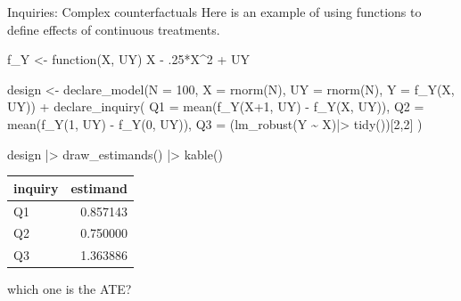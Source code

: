 \documentclass[
  11pt,
  ignorenonframetext,
]{beamer}
\newenvironment{Shaded}{\begin{snugshade}}{\end{snugshade}}
\newcommand{\AttributeTok}[1]{\textcolor[rgb]{0.40,0.45,0.13}{#1}}
\newcommand{\ControlFlowTok}[1]{\textcolor[rgb]{0.00,0.23,0.31}{#1}}
\newcommand{\DecValTok}[1]{\textcolor[rgb]{0.68,0.00,0.00}{#1}}
\newcommand{\FunctionTok}[1]{\textcolor[rgb]{0.28,0.35,0.67}{#1}}
\newcommand{\NormalTok}[1]{\textcolor[rgb]{0.00,0.23,0.31}{#1}}
\newcommand{\OtherTok}[1]{\textcolor[rgb]{0.00,0.23,0.31}{#1}}
\newcommand{\SpecialCharTok}[1]{\textcolor[rgb]{0.37,0.37,0.37}{#1}}
\begin{document}
\begin{frame}[fragile]{Inquiries: Complex counterfactuals}
\protect\hypertarget{inquiries-complex-counterfactuals-1}{}
Here is an example of using functions to define effects of continuous
treatments.

\begin{Shaded}
\begin{Highlighting}[]
\NormalTok{f\_Y }\OtherTok{\textless{}{-}} \ControlFlowTok{function}\NormalTok{(X, UY) X }\SpecialCharTok{{-}}\NormalTok{ .}\DecValTok{25}\SpecialCharTok{*}\NormalTok{X}\SpecialCharTok{\^{}}\DecValTok{2} \SpecialCharTok{+}\NormalTok{ UY}

\NormalTok{design }\OtherTok{\textless{}{-}} 
  \FunctionTok{declare\_model}\NormalTok{(}\AttributeTok{N =} \DecValTok{100}\NormalTok{,}
                \AttributeTok{X  =} \FunctionTok{rnorm}\NormalTok{(N),}
                \AttributeTok{UY =} \FunctionTok{rnorm}\NormalTok{(N),}
                \AttributeTok{Y =} \FunctionTok{f\_Y}\NormalTok{(X, UY)) }\SpecialCharTok{+}
  \FunctionTok{declare\_inquiry}\NormalTok{(}
    \AttributeTok{Q1 =} \FunctionTok{mean}\NormalTok{(}\FunctionTok{f\_Y}\NormalTok{(X}\SpecialCharTok{+}\DecValTok{1}\NormalTok{, UY) }\SpecialCharTok{{-}} \FunctionTok{f\_Y}\NormalTok{(X, UY)),}
    \AttributeTok{Q2 =} \FunctionTok{mean}\NormalTok{(}\FunctionTok{f\_Y}\NormalTok{(}\DecValTok{1}\NormalTok{, UY) }\SpecialCharTok{{-}} \FunctionTok{f\_Y}\NormalTok{(}\DecValTok{0}\NormalTok{, UY)),}
    \AttributeTok{Q3 =}\NormalTok{ (}\FunctionTok{lm\_robust}\NormalTok{(Y }\SpecialCharTok{\textasciitilde{}}\NormalTok{ X)}\SpecialCharTok{|\textgreater{}} \FunctionTok{tidy}\NormalTok{())[}\DecValTok{2}\NormalTok{,}\DecValTok{2}\NormalTok{]}
\NormalTok{    )}

\NormalTok{design }\SpecialCharTok{|\textgreater{}} \FunctionTok{draw\_estimands}\NormalTok{() }\SpecialCharTok{|\textgreater{}} \FunctionTok{kable}\NormalTok{()}
\end{Highlighting}
\end{Shaded}

\begin{tabular}{l|r}
\hline
inquiry & estimand\\
\hline
Q1 & 0.857143\\
\hline
Q2 & 0.750000\\
\hline
Q3 & 1.363886\\
\hline
\end{tabular}

which one is the ATE?
\end{frame}
\end{document}
